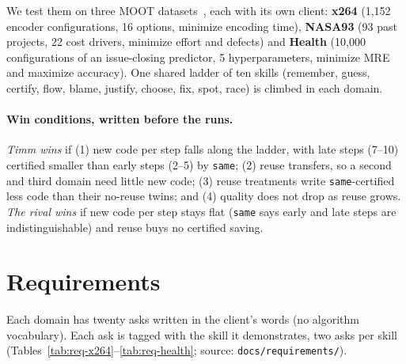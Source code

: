 \documentclass[acmsmall,nonacm]{acmart}
\newcommand{\same}{\texttt{same}}
\begin{document}
We test them on three MOOT datasets~\cite{moot}, each with its own client: \textbf{x264} (1,152 encoder configurations, 16 options, minimize encoding time), \textbf{NASA93} (93 past projects, 22 cost drivers, minimize effort and defects) and \textbf{Health} (10,000 configurations of an issue-closing predictor, 5 hyperparameters, minimize MRE and maximize accuracy). One shared ladder of ten skills (remember, guess, certify, flow, blame, justify, choose, fix, spot, race) is climbed in each domain.

\paragraph{Win conditions, written before the runs.} \emph{Timm wins} if (1) new code per step falls along the ladder, with late steps (7--10) certified smaller than early steps (2--5) by \same; (2) reuse transfers, so a second and third domain need little new code; (3) reuse treatments write \same-certified less code than their no-reuse twins; and (4) quality does not drop as reuse grows. \emph{The rival wins} if new code per step stays flat (\same{} says early and late steps are indistinguishable) and reuse buys no certified saving.

\section{Requirements}

Each domain has twenty asks written in the client's words (no algorithm vocabulary). Each ask is tagged with the skill it demonstrates, two asks per skill (Tables~\ref{tab:req-x264}--\ref{tab:req-health}; source: \texttt{docs/requirements/}).

\begin{table}[ht]
\caption{x264 requirements.}\label{tab:req-x264}
\footnotesize
\end{table}
\begin{table}[ht]
\caption{NASA93 requirements.}\label{tab:req-nasa}
\footnotesize
\end{table}
\begin{table}[ht]
\caption{Health requirements.}\label{tab:req-health}
\footnotesize
\end{table}

\end{document}
